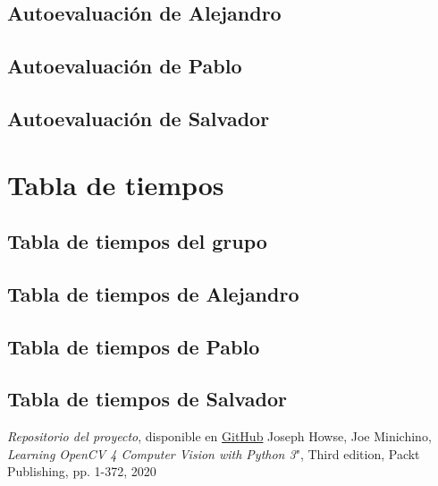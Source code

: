 \documentclass[a4paper]{article}
\begin{document}
\subsection{Autoevaluación de Alejandro}

\subsection{Autoevaluación de Pablo}

\subsection{Autoevaluación de Salvador}

\section{Tabla de tiempos}

\subsection{Tabla de tiempos del grupo}

\subsection{Tabla de tiempos de Alejandro}

\subsection{Tabla de tiempos de Pablo}

\subsection{Tabla de tiempos de Salvador}

\begin{thebibliography}{99}
 \textit{Repositorio del proyecto}, disponible en \href{https://github.com/PacktPublishing/Learning-OpenCV-4-Computer-Vision-with-Python-Third-Edition}{GitHub}
 Joseph Howse, Joe Minichino, \textit{Learning OpenCV 4 Computer Vision with Python 3}", Third edition, Packt Publishing, pp. 1-372, 2020
\end{thebibliography}
\end{document}
